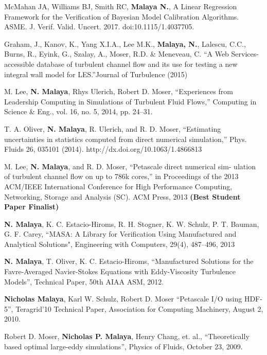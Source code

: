 %

McMahan JA, Williams BJ, Smith RC, \textbf{Malaya N.}, A Linear Regression
Framework for the Verification of Bayesian Model Calibration
Algorithms. ASME. J. Verif. Valid. Uncert. 2017. doi:10.1115/1.4037705. 

\blankline

 Graham, J., Kanov, K., Yang X.I.A., Lee M.K., \textbf{Malaya, N.}, 
Lalescu, C.C., Burns, R., Eyink, G., Szalay, A., Moser, R.D. \& 
Meneveau, C. ``A Web Services-accessible database of turbulent channel
flow and its use for testing a new integral wall model for LES.''Journal
of Turbulence  (2015)

\blankline

M. Lee, \textbf{N. Malaya}, Rhys Ulerich, Robert D. Moser,  “Experiences from
Leadership Computing in Simulations of Turbulent Fluid Flows,”
Computing in Science \& Eng., vol. 16, no. 5, 2014, pp. 24–31.

\blankline

T. A. Oliver, \textbf{N. Malaya}, R. Ulerich, and R. D. Moser, “Estimating
uncertainties in statistics computed from direct numerical simulation,”
Phys. Fluids 26, 035101 (2014). http://dx.doi.org/10.1063/1.4866813 

\blankline

M. Lee, \textbf{N. Malaya}, and R. D. Moser, ``Petascale direct numerical sim-
ulation of turbulent channel flow on up to 786k cores,'' in Proceedings
of the 2013 ACM/IEEE International Conference for High Performance
Computing, Networking, Storage and Analysis (SC). ACM Press, 2013 {\bf(Best
Student Paper Finalist)}

\blankline

\textbf{N. Malaya}, K. C. Estacio-Hiroms, R. H. Stogner, K. W. Schulz, P. T. Bauman,
G. F. Carey, ``MASA: A Library for Verification Using Manufactured and
Analytical Solutions", Engineering with Computers, 29(4), 487--496, 2013

\blankline

\textbf{N. Malaya}, T. Oliver, K. C. Estacio-Hiroms, ``Manufactured Solutions for
the Favre-Averaged Navier-Stokes Equations 
with Eddy-Viscosity Turbulence Models'', Technical Paper, 50th AIAA ASM, 2012.

\blankline

\textbf{Nicholas Malaya}, Karl W. Schulz, Robert D. Moser
``Petascale I/O using HDF-5'', Teragrid'10 Technical Paper, Association for Computing Machinery,
August 2, 2010.

\blankline

Robert D. Moser, \textbf{Nicholas P. Malaya}, Henry Chang, et. al.,
``Theoretically based optimal large-eddy simulations'', Physics of Fluids, October 23, 2009.

